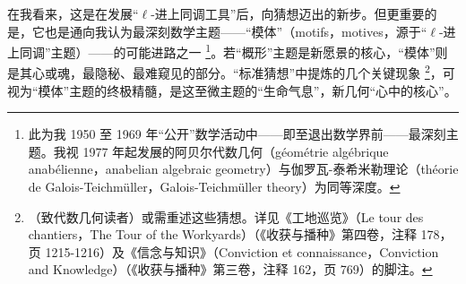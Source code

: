在我看来，这是在发展“$\ell$-进上同调工具”后，向猜想迈出的新步。但更重要的是，它也是通向我认为最深刻数学主题——“模体”（motifs，motives，源于“$\ell$-进上同调”主题）——的可能进路之一 \footnote{此为我 1950 至 1969 年“公开”数学活动中——即至退出数学界前——最深刻主题。我视 1977 年起发展的阿贝尔代数几何（géométrie algébrique anabélienne，anabelian algebraic geometry）与伽罗瓦-泰希米勒理论（théorie de Galois-Teichmüller，Galois-Teichmüller theory）为同等深度。}。若“概形”主题是新愿景的核心，“模体”则是其心或魂，最隐秘、最难窥见的部分。“标准猜想”中提炼的几个关键现象 \footnote{（致代数几何读者）或需重述这些猜想。详见《工地巡览》（Le tour des chantiers，The Tour of the Workyards）（《收获与播种》第四卷，注释 178，页 1215-1216）及《信念与知识》（Conviction et connaissance，Conviction and Knowledge）（《收获与播种》第三卷，注释 162，页 769）的脚注。}，可视为“模体”主题的终极精髓，是这至微主题的“生命气息”，新几何“心中的核心”。

